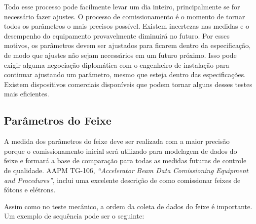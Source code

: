 \documentclass[11pt,a4paper]{article}
\newcounter{exemplo}
\begin{document}
	Todo esse processo pode facilmente levar um dia inteiro, principalmente se for necessário fazer ajustes. O processo de comissionamento é o momento de tornar todos os parâmetros o mais precisos possível. Existem incertezas nas medidas e o desempenho do equipamento provavelmente diminuirá no futuro. Por esses motivos, os parâmetros devem ser ajustados para ficarem dentro da especificação, de modo que ajustes não sejam necessários em um futuro próximo. Isso pode exigir alguma negociação diplomática com o engenheiro de instalação para continuar ajustando um parâmetro, mesmo que esteja dentro das especificações. Existem dispositivos comerciais disponíveis que podem tornar alguns desses testes mais eficientes.

\subsection*{Parâmetros do Feixe}

	A medida dos parâmetros do feixe deve ser realizada com a maior precisão porque o comissionamento inicial será utilizado para modelagem de dados do feixe e formará a base de comparação para todas as medidas futuras de controle de qualidade. AAPM TG-106, \textit{``Accelerator Beam Data Comissioning Equipment and Procedures''}, inclui uma excelente descrição de como comissionar feixes de fótons e elétrons.

	Assim como no teste mecânico, a ordem da coleta de dados do feixe é importante. Um exemplo de sequência pode ser o seguinte:
\end{document}
